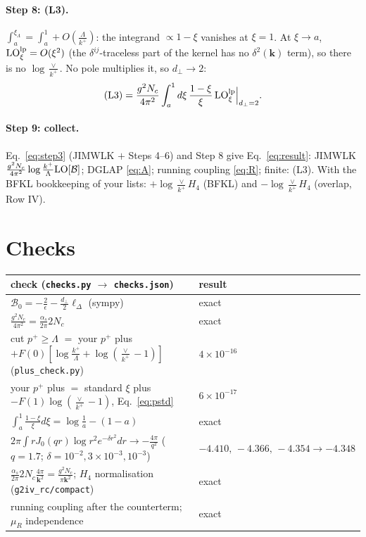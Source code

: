 \documentclass[10pt]{article}
\numberwithin{equation}{section}
\newcommand{\LO}{{\rm LO}}
\begin{document}
\paragraph{Step 8: (L3).} $\int_a^{\xi_\Lambda}=\int_a^1+O(\frac{\Lambda}{k^+})$: the integrand $\propto1-\xi$ vanishes at $\xi=1$. At $\xi\to a$, $\LO^{\rm lp}_\xi=O(\xi^2)$ (the $\delta^{ij}$-traceless part of the kernel has no $\delta^2(\mathbf k)$ term), so there is no $\log\frac{\vee}{k^+}$. No pole multiplies it, so $d_\perp\to2$:
\begin{equation}
\text{(L3)}=\frac{g^2N_c}{4\pi^2}\int_a^1d\xi\,\frac{1-\xi}{\xi}\,\LO^{\rm lp}_\xi\Big|_{d_\perp=2}.
\end{equation}
\paragraph{Step 9: collect.} Eq.~\eqref{eq:step3} (JIMWLK $+$ Steps 4--6) and Step 8 give Eq.~\eqref{eq:result}: JIMWLK $\frac{g^2N_c}{4\pi^2}\log\frac{k^+}{\Lambda}\LO[\mathcal B]$; DGLAP \eqref{eq:A}; running coupling \eqref{eq:R}; finite: (L3). With the BFKL bookkeeping of your lists: $+\log\frac{\vee}{k^+}H_4$ (BFKL) and $-\log\frac{\vee}{k^+}H_4$ (overlap, Row IV).

\section{Checks}\label{sec:checks}
\begin{center}\small
\begin{tabular}{@{}ll@{}}\toprule
check (\texttt{checks.py} $\to$ \texttt{checks.json}) & result\\\midrule
$\mathcal B_0=-\frac2\epsilon-\frac{d_\perp}{2}\ell_\Delta$ (sympy) & exact\\
$\frac{g^2N_c}{4\pi^2}=\frac{\alpha_s}{2\pi}2N_c$ & exact\\
cut $p^+\ge\Lambda$ $=$ your $p^+$ plus $+F(0)[\log\frac{k^+}{\Lambda}+\log(\frac{\vee}{k^+}-1)]$ (\texttt{plus\_check.py}) & $4\times10^{-16}$\\
your $p^+$ plus $=$ standard $\xi$ plus $-F(1)\log(\frac{\vee}{k^+}-1)$, Eq.~\eqref{eq:pstd} & $6\times10^{-17}$\\
$\int_a^1\frac{1-\xi}{\xi}d\xi=\log\frac1a-(1-a)$ & exact\\
$2\pi\int rJ_0(qr)\log r^2e^{-\delta r^2}dr\to-\frac{4\pi}{q^2}$ ($q=1.7$; $\delta=10^{-2},3\times10^{-3},10^{-3}$) & $-4.410,\,-4.366,\,-4.354\to-4.348$\\
$\frac{\alpha_s}{2\pi}2N_c\frac{4\pi}{\mathbf k^2}=\frac{g^2N_c}{\pi\mathbf k^2}$; $H_4$ normalisation (\texttt{g2iv\_rc/compact}) & exact\\
running coupling after the counterterm; $\mu_R$ independence & exact\\\bottomrule
\end{tabular}
\end{center}
\end{document}
